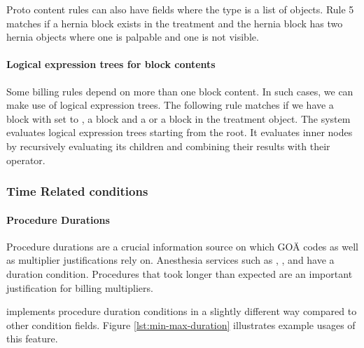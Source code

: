 Proto content rules can also have fields where the type is a list of objects.
Rule 5 matches if a hernia block exists in the treatment and the hernia block has two hernia objects where one is palpable and one is not visible.



\paragraph{Logical expression trees for block contents}
Some billing rules depend on more than one block content.
In such cases, we can make use of logical expression trees.
The following rule matches if we have a  block with  set to \true,
a  block and a  or a  block in the treatment object.
The system evaluates logical expression trees starting from the root.
It evaluates inner nodes by recursively evaluating its children and combining their results with their operator.




\subsubsection{Time Related conditions}

\paragraph{Procedure Durations}
Procedure durations are a crucial information source on which GOÄ codes as well as multiplier justifications rely on.
Anesthesia services such as , ,  and  have a duration condition.
Procedures that took longer than expected are an important justification for billing multipliers.

\RL implements procedure duration conditions in a slightly different way compared to other condition fields.
Figure \ref{lst:min-max-duration} illustrates example usages of this feature.



